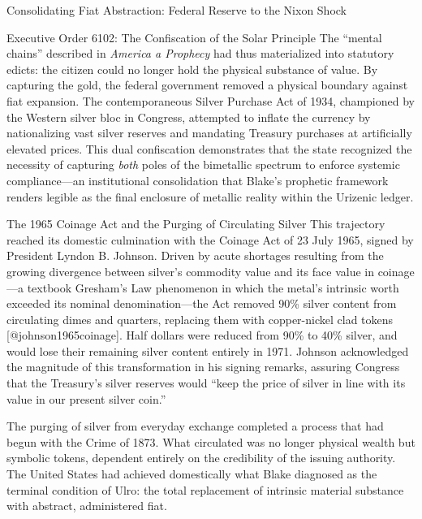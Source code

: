 \documentclass[
  ignorenonframetext,
]{beamer}
\begin{document}
\begin{frame}{Consolidating Fiat Abstraction: Federal Reserve to the
Nixon Shock}
\begin{block}{Executive Order 6102: The Confiscation of the Solar
Principle}
The ``mental chains'' described in \emph{America a Prophecy} had thus
materialized into statutory edicts: the citizen could no longer hold the
physical substance of value. By capturing the gold, the federal
government removed a physical boundary against fiat expansion. The
contemporaneous Silver Purchase Act of 1934, championed by the Western
silver bloc in Congress, attempted to inflate the currency by
nationalizing vast silver reserves and mandating Treasury purchases at
artificially elevated prices. This dual confiscation demonstrates that
the state recognized the necessity of capturing \emph{both} poles of the
bimetallic spectrum to enforce systemic compliance---an institutional
consolidation that Blake's prophetic framework renders legible as the
final enclosure of metallic reality within the Urizenic ledger.
\end{block}

\begin{block}{The 1965 Coinage Act and the Purging of Circulating
Silver}
\protect{}\label{the-1965-coinage-act-and-the-purging-of-circulating-silver}
This trajectory reached its domestic culmination with the Coinage Act of
23 July 1965, signed by President Lyndon B. Johnson. Driven by acute
shortages resulting from the growing divergence between silver's
commodity value and its face value in coinage---a textbook Gresham's Law
phenomenon in which the metal's intrinsic worth exceeded its nominal
denomination---the Act removed 90\% silver content from circulating
dimes and quarters, replacing them with copper-nickel clad tokens
{[}@johnson1965coinage{]}. Half dollars were reduced from 90\% to 40\%
silver, and would lose their remaining silver content entirely in 1971.
Johnson acknowledged the magnitude of this transformation in his signing
remarks, assuring Congress that the Treasury's silver reserves would
``keep the price of silver in line with its value in our present silver
coin.''

The purging of silver from everyday exchange completed a process that
had begun with the Crime of 1873. What circulated was no longer physical
wealth but symbolic tokens, dependent entirely on the credibility of the
issuing authority. The United States had achieved domestically what
Blake diagnosed as the terminal condition of Ulro: the total replacement
of intrinsic material substance with abstract, administered fiat.
\end{block}


\end{frame}
\end{document}
